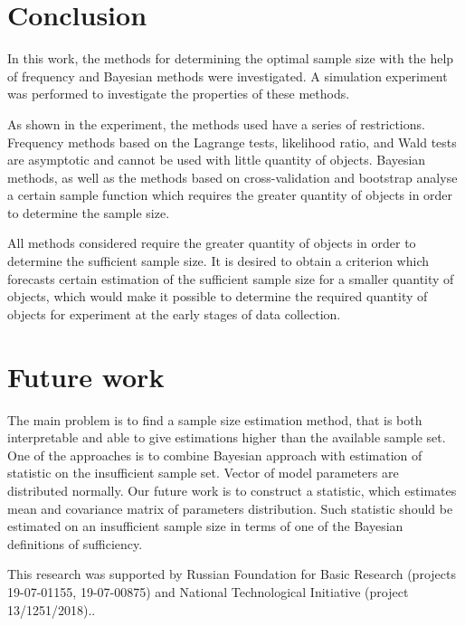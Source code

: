 \documentclass[
11pt,%
tightenlines,%
twoside,%
onecolumn,%
nofloats,%
nobibnotes,%
nofootinbib,%
superscriptaddress,%
noshowpacs,%
centertags]%
{revtex4}
\begin{document}
\section{Conclusion}
In this work, the methods for determining the optimal sample size with the help of frequency and Bayesian methods were investigated. A simulation experiment was performed to investigate the properties of these methods.

As shown in the experiment, the methods used have a series of restrictions. Frequency methods based on the Lagrange tests, likelihood ratio, and Wald tests are asymptotic and cannot be used with little quantity of objects. Bayesian methods, as well as the methods based on cross-validation and bootstrap analyse a certain sample function which requires the greater quantity of objects in order to determine the sample size.

All methods considered require the greater quantity of objects in order to determine the sufficient sample size. It is desired to obtain a criterion which forecasts certain estimation of the sufficient sample size for a smaller quantity of objects, which would make it possible to determine the required quantity of objects for experiment at the early stages of data collection.

\section{Future work}
The main problem is to find a sample size estimation method, that is both interpretable and able to give estimations higher than the available sample set. One of the approaches is to combine Bayesian approach with estimation of statistic on the insufficient sample set. Vector of model parameters are distributed normally. Our future work is to construct a statistic, which estimates mean and covariance matrix of parameters distribution. Such statistic should be estimated on an insufficient sample size in terms of one of the Bayesian definitions of sufficiency. 

\begin{acknowledgments}
This research was supported by Russian Foundation for Basic Research (projects 19-07-01155, 19-07-00875) and National Technological Initiative (project 13/1251/2018)..
\end{acknowledgments}
\end{document}
